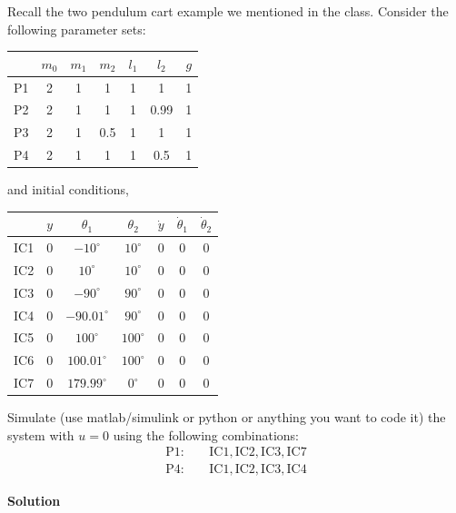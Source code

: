 \documentclass[12pt,a4paper]{article}
\begin{document}
Recall the two pendulum cart example we mentioned in the class. Consider the
following parameter sets:
\begin{center}
\begin{tabular}{c|cccccc}
 & $m_0$ & $m_1$ & $m_2$ & $l_1$ & $l_2$ & $g$ \\
\hline
P1 & 2 & 1 & 1   & 1 & 1    & 1 \\
P2 & 2 & 1 & 1   & 1 & 0.99 & 1 \\
P3 & 2 & 1 & 0.5 & 1 & 1    & 1 \\
P4 & 2 & 1 & 1   & 1 & 0.5  & 1
\end{tabular}
\end{center}
and initial conditions,
\begin{center}
\begin{tabular}{c|cccccc}
 & $y$ & $\theta_1$ & $\theta_2$ & $\dot y$ & $\dot\theta_1$ & $\dot\theta_2$ \\
\hline
IC1 & 0 & $-10^\circ$    & $10^\circ$  & 0 & 0 & 0 \\
IC2 & 0 & $10^\circ$     & $10^\circ$  & 0 & 0 & 0 \\
IC3 & 0 & $-90^\circ$    & $90^\circ$  & 0 & 0 & 0 \\
IC4 & 0 & $-90.01^\circ$ & $90^\circ$  & 0 & 0 & 0 \\
IC5 & 0 & $100^\circ$    & $100^\circ$ & 0 & 0 & 0 \\
IC6 & 0 & $100.01^\circ$ & $100^\circ$ & 0 & 0 & 0 \\
IC7 & 0 & $179.99^\circ$ & $0^\circ$   & 0 & 0 & 0
\end{tabular}
\end{center}
Simulate (use matlab/simulink or python or anything you want to code it) the system
with $u=0$ using the following combinations:
\[
\begin{aligned}
\mathrm{P1}:&\quad \mathrm{IC1},\mathrm{IC2},\mathrm{IC3},\mathrm{IC7}\\
\mathrm{P4}:&\quad \mathrm{IC1},\mathrm{IC2},\mathrm{IC3},\mathrm{IC4}
\end{aligned}
\]



\textbf{Solution}
\end{document}
